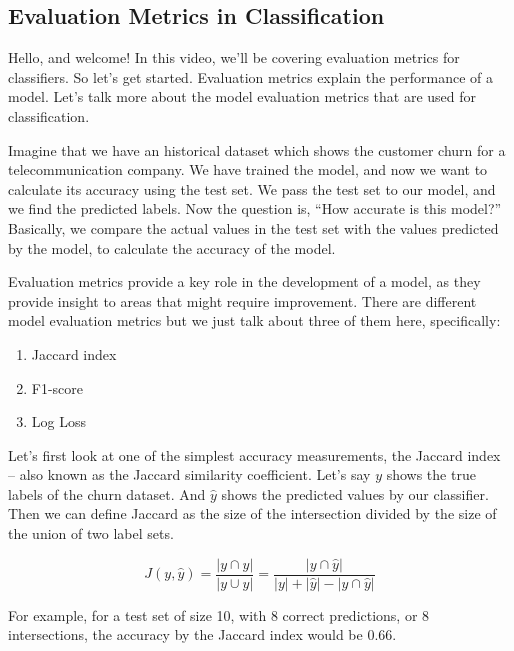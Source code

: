 	\subsection{Evaluation Metrics in Classification}
		
	Hello, and welcome! In this video, we’ll be covering evaluation metrics for classifiers. So let’s get started. Evaluation metrics explain the performance of a model. Let’s talk more about the model evaluation metrics that are used for classification. 
	
	Imagine that we have an historical dataset which shows the customer churn for a telecommunication company. We have trained the model, and now we want to calculate its accuracy using the test set. We pass the test set to our model, and we find the predicted labels. Now the question is, “How accurate is this model?” Basically, we compare the actual values in the test set with the values predicted by the model, to calculate the accuracy of the model. 
	
	Evaluation metrics provide a key role in the development of a model, as they provide insight to areas that might require improvement. There are different model evaluation metrics but we just talk about three of them here, specifically: 
	
	\begin{enumerate}
		\item Jaccard index
		\item F1-score 
		\item Log Loss 
	\end{enumerate}

	Let’s first look at one of the simplest accuracy measurements, the Jaccard index -- also known as the Jaccard similarity coefficient. Let’s say $y$ shows the true labels of the churn dataset. And $\hat{y}$ shows the predicted values by our classifier. Then we can define Jaccard as the size of the intersection divided by the size of the union of two label sets. 
	
	\begin{equation}
		J(y,\hat{y}) = \dfrac{|y \cap \hat{y}|}{|y \cup \hat{y}|} = \dfrac{|y \cap \hat{y}|}{|y| + |\hat{y}| - |y \cap \hat{y}|}
	\end{equation}
 	
	For example, for a test set of size 10, with 8 correct predictions, or 8 intersections, the accuracy by the Jaccard index would be 0.66. 
	
	
	
